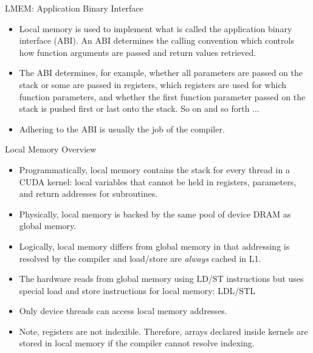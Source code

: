 \documentclass[handout]{beamer}
\begin{document}
\begin{frame}{LMEM: Application Binary Interface}
\begin{itemize}
\itemsep1em
	\item<1->Local memory is used to implement what is called the application binary interface (ABI).  An ABI determines the calling convention which controls how function arguments are passed and return values retrieved.
	\item<1->The ABI determines, for example, whether all parameters are passed on the stack or some are passed in registers, which registers are used for which function parameters, and whether the first function parameter passed on the stack is pushed first or last onto the stack. So on and so forth $\ldots$
	\item<1->Adhering to the ABI is usually the job of the compiler.
\end{itemize}
\end{frame}

\begin{frame}{Local Memory Overview}
\begin{itemize}
	\item<1->Programmatically, local memory contains the stack for every thread in a CUDA kernel: local variables that cannot be held in registers, parameters, and return addresses for subroutines.  
	\item<1->Physically, local memory is backed by the same pool of device DRAM as global memory.   
	\item<1->Logically, local memory differs from global memory in that addressing is resolved by the compiler and load/store are \emph{always} cached in L1. 
	\item<1->The hardware reads from global memory using LD/ST instructions but uses special load and store instructions for local memory: LDL/STL 
	\item<1->Only device threads can access local memory addresses.
	\item<1->Note, registers are not indexible. Therefore, arrays declared inside kernels are stored in local memory if the compiler cannot resolve indexing.
\end{itemize}
\end{frame}
\end{document}
